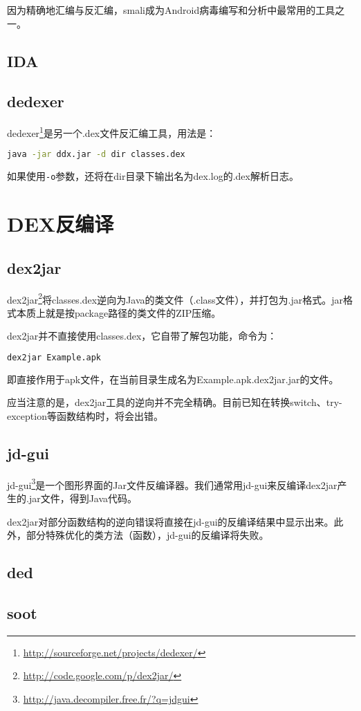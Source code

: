 因为精确地汇编与反汇编，smali成为Android病毒编写和分析中最常用的工具之一。
\subsection{IDA}
\subsection{dedexer}
dedexer\footnote{\url{http://sourceforge.net/projects/dedexer/}}是另一个.dex文件反汇编工具，用法是：
\begin{lstlisting}[language=bash, numbers=none]
java -jar ddx.jar -d dir classes.dex
\end{lstlisting}
如果使用\lstinline!-o!参数，还将在dir目录下输出名为dex.log的.dex解析日志。
\section{DEX反编译}
\subsection{dex2jar}
dex2jar\footnote{\url{http://code.google.com/p/dex2jar/}}将classes.dex逆向为Java的类文件（.class文件），并打包为.jar格式。jar格式本质上就是按package路径的类文件的ZIP压缩。

dex2jar并不直接使用classes.dex，它自带了解包功能，命令为：
\begin{lstlisting}[language=bash, numbers=none]
dex2jar Example.apk
\end{lstlisting}
即直接作用于apk文件，在当前目录生成名为Example.apk.dex2jar.jar的文件。

应当注意的是，dex2jar工具的逆向并不完全精确。目前已知在转换switch、try-exception等函数结构时，将会出错。
\subsection{jd-gui}
jd-gui\footnote{\url{http://java.decompiler.free.fr/?q=jdgui}}是一个图形界面的Jar文件反编译器。我们通常用jd-gui来反编译dex2jar产生的.jar文件，得到Java代码。

dex2jar对部分函数结构的逆向错误将直接在jd-gui的反编译结果中显示出来。此外，部分特殊优化的类方法（函数），jd-gui的反编译将失败。
\subsection{ded}
\subsection{soot}
